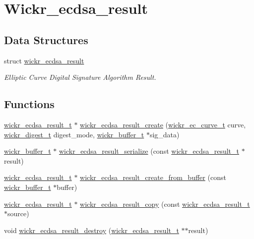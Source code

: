 \hypertarget{group__wickr__ecdsa__result}{}\section{Wickr\+\_\+ecdsa\+\_\+result}
\label{group__wickr__ecdsa__result}
\subsection*{Data Structures}
\begin{DoxyCompactItemize}
\item 
struct \hyperlink{structwickr__ecdsa__result}{wickr\+\_\+ecdsa\+\_\+result}
\begin{DoxyCompactList}\small\item\em Elliptic Curve Digital Signature Algorithm Result. \end{DoxyCompactList}\end{DoxyCompactItemize}
\subsection*{Functions}
\begin{DoxyCompactItemize}
\item 
\hyperlink{structwickr__ecdsa__result}{wickr\+\_\+ecdsa\+\_\+result\+\_\+t} $\ast$ \hyperlink{group__wickr__ecdsa__result_ga7e199a7c851fd07fb93180fb3a242749}{wickr\+\_\+ecdsa\+\_\+result\+\_\+create} (\hyperlink{structwickr__ec__curve}{wickr\+\_\+ec\+\_\+curve\+\_\+t} curve, \hyperlink{structwickr__digest}{wickr\+\_\+digest\+\_\+t} digest\+\_\+mode, \hyperlink{structwickr__buffer}{wickr\+\_\+buffer\+\_\+t} $\ast$sig\+\_\+data)
\item 
\hyperlink{structwickr__buffer}{wickr\+\_\+buffer\+\_\+t} $\ast$ \hyperlink{group__wickr__ecdsa__result_ga417d1186e93d6ae4ee4cf701a2bfb1b2}{wickr\+\_\+ecdsa\+\_\+result\+\_\+serialize} (const \hyperlink{structwickr__ecdsa__result}{wickr\+\_\+ecdsa\+\_\+result\+\_\+t} $\ast$result)
\item 
\hyperlink{structwickr__ecdsa__result}{wickr\+\_\+ecdsa\+\_\+result\+\_\+t} $\ast$ \hyperlink{group__wickr__ecdsa__result_gaa3a5ba5ce3df076cf5a9984f68e34c3a}{wickr\+\_\+ecdsa\+\_\+result\+\_\+create\+\_\+from\+\_\+buffer} (const \hyperlink{structwickr__buffer}{wickr\+\_\+buffer\+\_\+t} $\ast$buffer)
\item 
\hyperlink{structwickr__ecdsa__result}{wickr\+\_\+ecdsa\+\_\+result\+\_\+t} $\ast$ \hyperlink{group__wickr__ecdsa__result_ga8664bbdec0bc8b354b3cb35704c42f57}{wickr\+\_\+ecdsa\+\_\+result\+\_\+copy} (const \hyperlink{structwickr__ecdsa__result}{wickr\+\_\+ecdsa\+\_\+result\+\_\+t} $\ast$source)
\item 
void \hyperlink{group__wickr__ecdsa__result_ga84fb120b34b4b7ede4042009c735ea5d}{wickr\+\_\+ecdsa\+\_\+result\+\_\+destroy} (\hyperlink{structwickr__ecdsa__result}{wickr\+\_\+ecdsa\+\_\+result\+\_\+t} $\ast$$\ast$result)
\end{DoxyCompactItemize}


